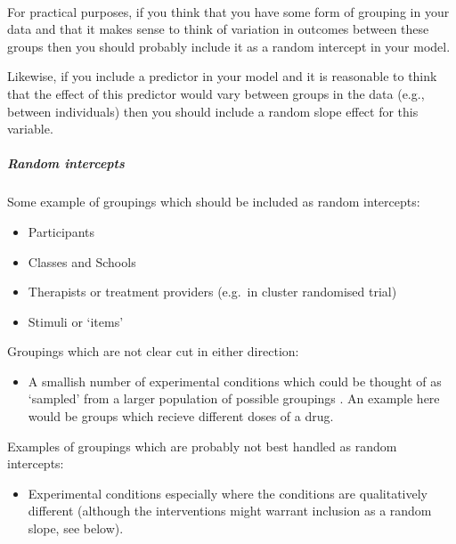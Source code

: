 \documentclass[]{article}
\providecommand{\tightlist}{%
  \setlength{\itemsep}{0pt}\setlength{\parskip}{0pt}}
\let\oldparagraph\paragraph
\renewcommand{\paragraph}[1]{\oldparagraph{#1}\mbox{}}
\let\oldsubparagraph\subparagraph
\renewcommand{\subparagraph}[1]{\oldsubparagraph{#1}\mbox{}}
\begin{document}
\hypertarget{random-slopes-intercepts}{%
\paragraph{}\label{random-slopes-intercepts}}

For practical purposes, if you think that you have some form of grouping in your
data and that it makes sense to think of variation in outcomes between these
groups then you should probably include it as a random intercept in your model.

Likewise, if you include a predictor in your model and it is reasonable to think
that the effect of this predictor would vary between groups in the data (e.g.,
between individuals) then you should include a random slope effect for this
variable.

\hypertarget{random-intercepts}{%
\subparagraph{Random intercepts}\label{random-intercepts}}

Some example of groupings which should be included as random intercepts:

\begin{itemize}
\tightlist
\item
  Participants
\item
  Classes and Schools
\item
  Therapists or treatment providers (e.g.~in cluster randomised trial)
\item
  Stimuli or `items'
\end{itemize}

Groupings which are not clear cut in either direction:

\begin{itemize}
\tightlist
\item
  A smallish number of experimental conditions which could be thought of as
  `sampled' from a larger population of possible groupings
  \citep{gelman2005analysis}. An example here would be groups which recieve
  different doses of a drug.
\end{itemize}

Examples of groupings which are probably not best handled as random intercepts:

\begin{itemize}
\tightlist
\item
  Experimental conditions especially where the conditions are qualitatively
  different (although the interventions might warrant inclusion as a random
  slope, see below).
\end{itemize}
\end{document}
